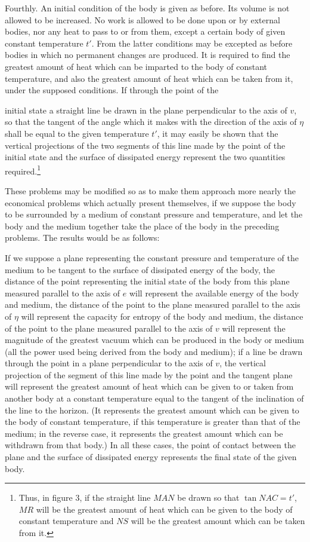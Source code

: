 \documentclass[11pt]{article}
\begin{document}
Fourthly. An initial condition of the body is given as before. Its volume is not allowed to be increased. No work is allowed to be done upon or by external bodies, nor any heat to pass to or from them, except a certain body of given constant temperature $t'$. From the latter conditions may be excepted as before bodies in which no permanent changes are produced. It is required to find the greatest amount of heat which can be imparted to the body of constant temperature, and also the greatest amount of heat which can be taken from it, under the supposed conditions. If through the point of the

initial state a straight line be drawn in the plane perpendicular to the axis of $v$, so that the tangent of the angle which it makes with the direction of the axis of $\eta$ shall be equal to the given temperature $t'$, it may easily be shown that the vertical projections of the two segments of this line made by the point of the initial state and the surface of dissipated energy represent the two quantities required.\footnote{Thus, in figure 3, if the straight line $MAN$ be drawn so that $\tan NAC=t'$, $MR$ will be the greatest amount of heat which can be given to the body of constant temperature and $NS$ will be the greatest amount which can be taken from it.}

These problems may be modified so as to make them approach more nearly the economical problems which actually present themselves, if we suppose the body to be surrounded by a medium of constant pressure and temperature, and let the body and the medium together take the place of the body in the preceding problems. The results would be as follows:

If we suppose a plane representing the constant pressure and temperature of the medium to be tangent to the surface of dissipated energy of the body, the distance of the point representing the initial state of the body from this plane measured parallel to the axis of $e$ will represent the available energy of the body and medium, the distance of the point to the plane measured parallel to the axis of $\eta$ will represent the capacity for entropy of the body and medium, the distance of the point to the plane measured parallel to the axis of $v$ will represent the magnitude of the greatest vacuum which can be produced in the body or medium (all the power used being derived from the body and medium); if a line be drawn through the point in a plane perpendicular to the axis of $v$, the vertical projection of the segment of this line made by the point and the tangent plane will represent the greatest amount of heat which can be given to or taken from another body at a constant temperature equal to the tangent of the inclination of the line to the horizon. (It represents the greatest amount which can be given to the body of constant temperature, if this temperature is greater than that of the medium; in the reverse case, it represents the greatest amount which can be withdrawn from that body.) In all these cases, the point of contact between the plane and the surface of dissipated energy represents the final state of the given body.
\end{document}
